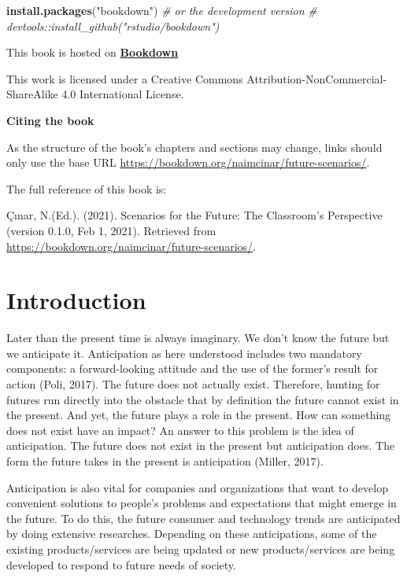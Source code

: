\documentclass[]{book}
\newenvironment{Shaded}{\begin{snugshade}}{\end{snugshade}}
\newcommand{\CommentTok}[1]{\textcolor[rgb]{0.56,0.35,0.01}{\textit{#1}}}
\newcommand{\KeywordTok}[1]{\textcolor[rgb]{0.13,0.29,0.53}{\textbf{#1}}}
\newcommand{\NormalTok}[1]{#1}
\newcommand{\StringTok}[1]{\textcolor[rgb]{0.31,0.60,0.02}{#1}}
\begin{document}
\begin{Shaded}
\begin{Highlighting}[]
\KeywordTok{install.packages}\NormalTok{(}\StringTok{"bookdown"}\NormalTok{)}
\CommentTok{# or the development version}
\CommentTok{# devtools::install_github("rstudio/bookdown")}
\end{Highlighting}
\end{Shaded}

This book is hosted on \textbf{\href{https://bookdown.org}{Bookdown}}

This work is licensed under a Creative Commons Attribution-NonCommercial-ShareAlike 4.0 International License.

\textbf{Citing the book}

As the structure of the book's chapters and sections may change, links should only use the base URL \url{https://bookdown.org/naimcinar/future-scenarios/}.

The full reference of this book is:

Çınar, N.(Ed.). (2021). Scenarios for the Future: The Classroom's Perspective (version 0.1.0, Feb 1, 2021).
Retrieved from \url{https://bookdown.org/naimcinar/future-scenarios/}.

\hypertarget{intro}{%
\chapter{Introduction}\label{intro}}

Later than the present time is always imaginary. We don't know the future but we anticipate it. Anticipation as here understood includes two mandatory components: a forward-looking attitude and the use of the former's result for action (Poli, 2017). The future does not actually exist. Therefore, hunting for futures run directly into the obstacle that by definition the future cannot exist in the present. And yet, the future plays a role in the present. How can something does not exist have an impact? An answer to this problem is the idea of anticipation. The future does not exist in the present but anticipation does. The form the future takes in the present is anticipation (Miller, 2017).

Anticipation is also vital for companies and organizations that want to develop convenient solutions to people's problems and expectations that might emerge in the future. To do this, the future consumer and technology trends are anticipated by doing extensive researches. Depending on these anticipations, some of the existing products/services are being updated or new products/services are being developed to respond to future needs of society.
\end{document}
